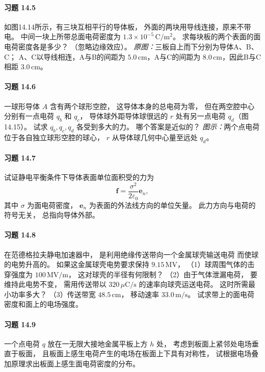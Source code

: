 \paragraph{习题 14.5}
如图14.14所示，有三块互相平行的导体板，
外面的两块用导线连接，原来不带电。
中间一块上所带总面电荷密度为
\(1.3\times10^{-5}\,\mathrm{C/m^2}\)。
求每块板的两个表面的面电荷密度各是多少？
（忽略边缘效应）。
\textit{原图：}三板自上而下分别为导体A、B、C；
A、C以导线相连，A与B的间距为
\(5.0\,\mathrm{cm}\)，A与C的间距为
\(8.0\,\mathrm{cm}\)，因此B与C相距
\(3.0\,\mathrm{cm}\)。

\paragraph{习题 14.6}
一球形导体 \(A\) 含有两个球形空腔，
这导体本身的总电荷为零，
但在两空腔中心分别有一点电荷 \(q_b\) 和 \(q_c\)，
导体球外距导体球很远的 \(r\) 处有另一点电荷
\(q_d\)（图14.15）。
试求 \(q_b,q_c,q_d\) 各受到多大的力。
哪个答案是近似的？
\textit{图示：}两个点电荷位于各自独立球形空腔的球心，
\(r\) 从导体球几何中心量至远处 \(q_d\)。

\paragraph{习题 14.7}
试证静电平衡条件下导体表面单位面积受的力为
\[
 \boldsymbol f=\frac{\sigma^2}{2\varepsilon_0}\boldsymbol e_n,
\]
其中 \(\sigma\) 为面电荷密度，
\(\boldsymbol e_n\) 为表面的外法线方向的单位矢量。
此力方向与电荷的符号无关，
总指向导体外部。

\paragraph{习题 14.8}
在范德格拉夫静电加速器中，
是利用绝缘传送带向一个金属球壳输送电荷
而使球的电势升高的。
如果这金属球壳电势要求保持 \(9.15\,\mathrm{MV}\)，
（1）球周围气体的击穿强度为
\(100\,\mathrm{MV/m}\)，
这对球壳的半径有何限制？
（2）由于气体泄漏电荷，
要维持此电势不变，
需用传送带以 \(320\,\mu\mathrm{C/s}\)
的速率向球壳运送电荷。
这时所需最小功率多大？
（3）传送带宽 \(48.5\,\mathrm{cm}\)，
移动速率 \(33.0\,\mathrm{m/s}\)。
试求带上的面电荷密度和面上的电场强度。

\paragraph{习题 14.9}
一个点电荷 \(q\) 放在一无限大接地金属平板上方
\(h\) 处，
考虑到板面上紧邻处电场垂直于板面，
且板面上感生电荷产生的电场在板面上下具有对称性，
试根据电场叠加原理求出板面上感生面电荷密度的分布。

